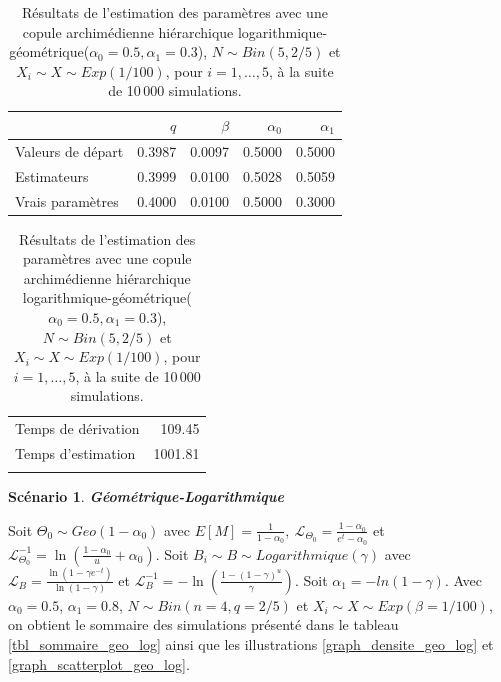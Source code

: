 \documentclass{article}
\newtheorem{Scenario}{Scénario}
\begin{document}
	\begin{table}[H]
		\centering
		\begin{tabular}{lrrrr}
			\hline
			& $q$ & $\beta$ & $\alpha_0$ & $\alpha_1$ \\ 
			\hline
			Valeurs de départ & 0.3987 & 0.0097 & 0.5000 & 0.5000 \\ 
			Estimateurs & 0.3999 & 0.0100 & 0.5028 & 0.5059 \\ 
			Vrais paramètres & 0.4000 & 0.0100 & 0.5000 & 0.3000 \\
			\hline
		\end{tabular}
		\begin{tabular}{lr}
			\hline
			&  \\ 
			\hline
			Temps de dérivation & 109.45 \\ 
			Temps d'estimation & 1001.81 \\ 
			\\
			\hline
		\end{tabular}
		\caption[Résultats du scénario \ref{scenario_log_geo}]{Résultats de l'estimation des paramètres avec une copule archimédienne hiérarchique logarithmique-géométrique($\alpha_0=0.5, \alpha_1 = 0.3$), $N \sim Bin(5, 2/5)$ et $X_i \sim X \sim Exp(1/100)$, pour $i=1,\dots,5$, à la suite de 10\,000 simulations.}
		\label{tbl_resultats_log_geo}
	\end{table}



	\begin{Scenario}\label{scenario_geo_log}
		\textbf{Géométrique-Logarithmique}
	\end{Scenario}
	
	Soit $\Theta_0 \sim Geo(1-\alpha_0)$ avec $E[M] = \frac{1}{1-\alpha_0},\ \mathscr{L}_{\Theta_0} = \frac{1-\alpha_0}{e^t-\alpha_0}$ et $\mathscr{L}^{-1}_{\Theta_0} = \ln\left(\frac{1 - \alpha_0}{u}+\alpha_0\right)$.
	Soit $B_i \sim B \sim Logarithmique(\gamma)$ avec $\mathscr{L}_{B} = \frac{\ln(1-\gamma e^{-t})}{\ln(1-\gamma)}$ et $\mathscr{L}^{-1}_{B} = -\ln \left( \frac{1-(1-\gamma)^u}{\gamma} \right)$. Soit $\alpha_{1} = -ln(1-\gamma)$. Avec $\alpha_0 = 0.5$, $\alpha_1 = 0.8$, $N\sim Bin(n=4, q=2/5)$ et $X_i \sim X \sim Exp(\beta = 1/100)$, on obtient le sommaire des simulations présenté dans le tableau \ref{tbl_sommaire_geo_log} ainsi que les illustrations \ref{graph_densite_geo_log} et \ref{graph_scatterplot_geo_log}.
	
\end{document}
